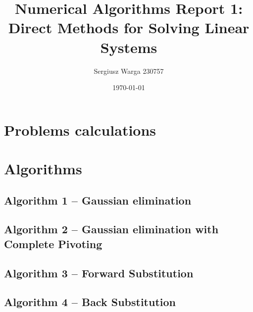 \documentclass[a4paper]{article}
\title{Numerical Algorithms Report 1: Direct Methods for Solving Linear Systems}
\author{Sergiusz Warga 230757}
\date{\today}
\begin{document}
\maketitle
\tableofcontents
\pagebreak


\section{Problems calculations}






% 

\section{Algorithms}
\subsection{Algorithm 1 -- Gaussian elimination}\label{algorithm:1}

\subsection{Algorithm 2 -- Gaussian  elimination  with  Complete  Pivoting}\label{algorithm:2}

\subsection{Algorithm 3 -- Forward Substitution}\label{algorithm:3}

\subsection{Algorithm 4 -- Back Substitution}\label{algorithm:4}

\end{document}
